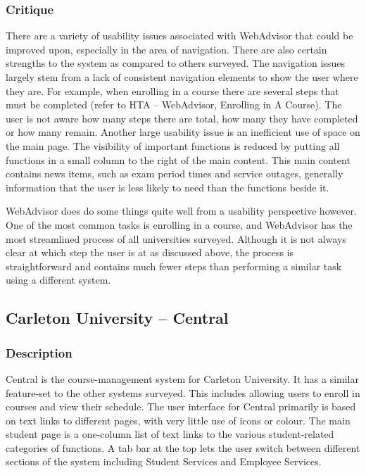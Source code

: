 \documentclass[10pt]{article}
\begin{document}
\begin{multicols}{2}
\subsubsection*{Critique}
There are a variety of usability issues associated with \mbox{WebAdvisor} that 
could be improved upon, especially in the area of navigation. There are also 
certain strengths to the system as compared to others surveyed. The navigation 
issues largely stem from a lack of consistent navigation elements to show the 
user where they are. For example, when enrolling in a course there are several 
steps that must be completed (refer to HTA -- WebAdvisor, Enrolling in A 
Course). The user is not aware how many steps there are total, how many they 
have completed or how many remain. Another large usability issue is an 
inefficient use of space on the main page. The visibility of important functions 
is reduced by putting all functions in a small column to the right of the main 
content. This main content contains news items, such as exam period times and 
service outages, generally information that the user is less likely to need than 
the functions beside it.

WebAdvisor does do some things quite well from a usability perspective however. 
One of the most common tasks is enrolling in a course, and WebAdvisor has the 
most streamlined process of all universities surveyed. Although it is not always 
clear at which step the user is at as discussed above, the process is 
straightforward and contains much fewer steps than performing a similar task 
using a different system.

\subsection*{Carleton University -- Central}
\subsubsection*{Description}
Central is the course-management system for Carleton University. It has a 
similar feature-set to the other systems surveyed. This includes allowing users 
to enroll in courses and view their schedule. The user interface for Central 
primarily is based on text links to different pages, with very little use of 
icons or colour. The main student page is a one-column list of text links to the 
various student-related categories of functions. A tab bar at the top lets the 
user switch between different sections of the system including Student Services 
and Employee Services.


\end{multicols}
\end{document}

